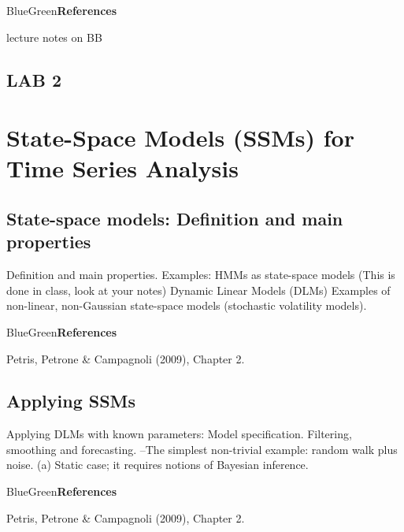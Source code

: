 \documentclass[dvipsnames,12pt]{book}
\begin{document}
            \begin{mybox}{BlueGreen}{\textbf{References}}

                lecture notes on BB
                
            \end{mybox}

    \chapter*{LAB 2}

\part{State-Space Models (SSMs) for Time Series Analysis}

    \chapter[State-space models]{State-space models: Definition and main properties}

        Definition and main properties.
        Examples:
        HMMs as state-space models (This is done in class, look at your notes)
        Dynamic Linear Models (DLMs)
        Examples of non-linear, non-Gaussian state-space models (stochastic volatility models).

        \begin{mybox}{BlueGreen}{\textbf{References}}

            Petris, Petrone \& Campagnoli (2009), Chapter 2.
            
        \end{mybox}

    \chapter{Applying SSMs}

        Applying DLMs with known parameters:
        Model specification.
        Filtering, smoothing and forecasting.
        --The simplest non-trivial example: random walk plus noise. (a) Static case; it requires notions of Bayesian inference.

        \begin{mybox}{BlueGreen}{\textbf{References}}

            Petris, Petrone \& Campagnoli (2009), Chapter 2.
            
        \end{mybox}
\end{document}
